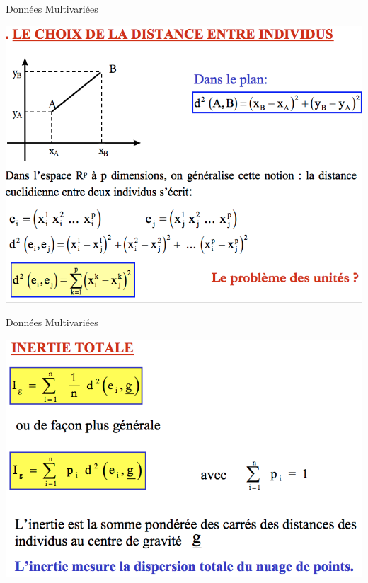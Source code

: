 \documentclass[12pt]{beamer}
\begin{document}
\begin{frame}{Données Multivariées}

  
\centering 
 \includegraphics[scale=0.45]{Dist.png} 
 

\end{frame}
\begin{frame}{Données Multivariées}

  
\centering 
 \includegraphics[scale=0.45]{Dist2.png} 
 

\end{frame}
\end{document}
